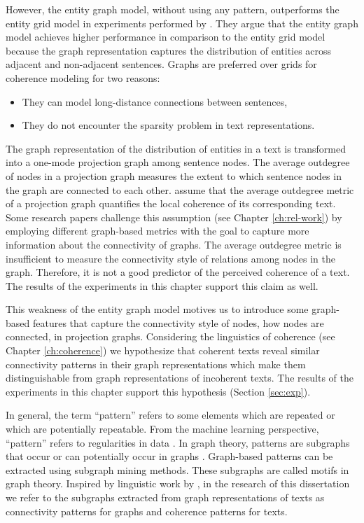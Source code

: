 However, the entity graph model, without using any pattern, outperforms the entity grid model in experiments performed by . 
They argue that the entity graph model achieves higher performance in comparison to the entity grid model because the graph representation captures the distribution of entities across adjacent and non-adjacent sentences. 
Graphs are preferred over grids for coherence modeling for two reasons:

\begin{itemize}

	\item They can model long-distance connections between sentences,

	\item They do not encounter the sparsity problem in text representations. 

\end{itemize}

The graph representation of the distribution of entities in a text is transformed into a \mbox{one-mode} projection graph among sentence nodes. 
The average outdegree of nodes in a projection graph measures the extent to which sentence nodes in the graph are connected to each other. 
 assume that the average outdegree metric of a projection graph quantifies the local coherence of its corresponding text. 
Some research papers challenge this assumption (see Chapter \ref{ch:rel-work}) by employing different graph-based metrics with the goal to capture more information about the connectivity of graphs. 
The average outdegree metric is insufficient to measure the connectivity style of relations among nodes in the graph. 
Therefore, it is not a good predictor of the perceived coherence of a text. 
The results of the experiments in this chapter support this claim as well. 

This weakness of the entity graph model motives us to introduce some graph-based features that capture the connectivity style of nodes, how nodes are connected, in projection graphs. 
Considering the linguistics of coherence (see Chapter \ref{ch:coherence}) we hypothesize that coherent texts reveal similar connectivity patterns in their graph representations which make them distinguishable from graph representations of incoherent texts. 
The results of the experiments in this chapter support this hypothesis (Section \ref{sec:exp}). 

In general, the term ``pattern'' refers to some elements which are repeated or which are potentially repeatable. 
From the machine learning perspective, ``pattern'' refers to regularities in data \cite{bishop06}.     
In graph theory, patterns are subgraphs that occur or can potentially occur in graphs \cite{newmanmark10}. 
Graph-based patterns can be extracted using subgraph mining methods. 
These subgraphs are called motifs in graph theory. 
Inspired by linguistic work by , in the research of this dissertation we refer to the subgraphs extracted from graph representations of texts as connectivity patterns for graphs and coherence patterns for texts.  


